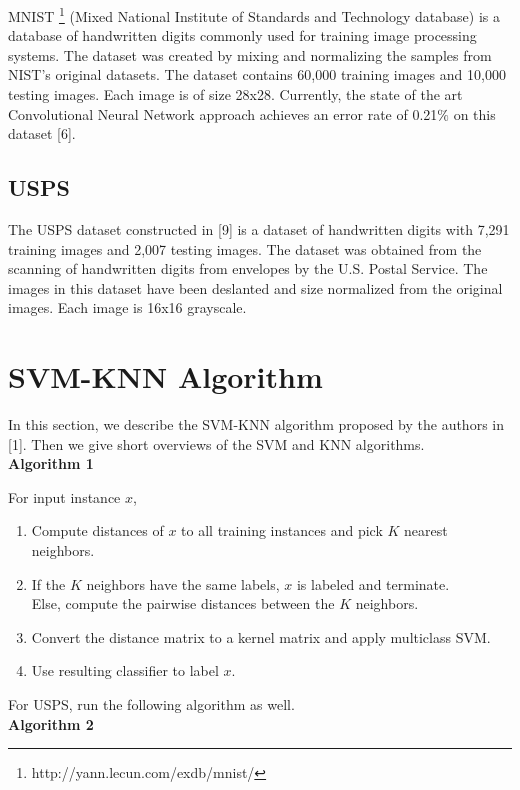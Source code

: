 \documentclass[11pt,letterpaper]{article}
\begin{document}
MNIST \footnote{http://yann.lecun.com/exdb/mnist/} (Mixed National Institute of Standards and Technology database) is a database of handwritten digits commonly used for training image processing systems. The dataset was created by mixing and normalizing the samples from NIST's original datasets. The dataset contains 60,000 training images and 10,000 testing images. Each image is of size 28x28. Currently, the state of the art Convolutional Neural Network approach achieves an error rate of 0.21$\%$ on this dataset [6].

\subsection{USPS}

The USPS dataset constructed in [9] is a dataset of handwritten digits with 7,291 training images and 2,007 testing images. The dataset was obtained from the scanning of handwritten digits from envelopes by the U.S. Postal Service. The images in this dataset have been deslanted and size normalized from the original images. Each image is 16x16 grayscale.

\section{SVM-KNN Algorithm}

In this section, we describe the SVM-KNN algorithm proposed by the authors in [1]. Then we give short overviews of the SVM and KNN algorithms.\\

\textbf{Algorithm 1}

For input instance $x$,
\begin{enumerate}[(1)]
\item Compute distances of $x$ to all training instances and pick $K$ nearest neighbors.
\item If the $K$ neighbors have the same labels, $x$ is labeled and terminate.\\
\qquad Else, compute the pairwise distances between the $K$ neighbors.
\item Convert the distance matrix to a kernel matrix and apply multiclass SVM.
\item Use resulting classifier to label $x$.
\end{enumerate}

For USPS, run the following algorithm as well.\\

\textbf{Algorithm 2}
\end{document}

